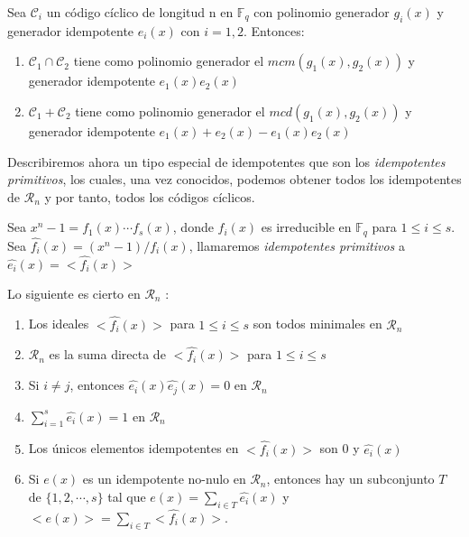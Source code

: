\begin{theorem}
\label{th:inter_suma_generadores}
Sea $\mathcal{C}_i$ un código cíclico de longitud n en $\mathbb{F}_q$ con polinomio generador $g_i(x)$ y generador idempotente $e_i(x)$ con $i = 1,2$. Entonces:
\begin{enumerate}
	\item $\mathcal{C}_1 \cap \mathcal{C}_2$ tiene como polinomio generador el $mcm(g_1(x),g_2(x))$ y generador idempotente $e_1(x)e_2(x)$
	\item $\mathcal{C}_1 + \mathcal{C}_2$ tiene como polinomio generador el $mcd(g_1(x),g_2(x))$ y generador idempotente $e_1(x) + e_2(x) - e_1(x)e_2(x)$
\end{enumerate}
\end{theorem}


Describiremos ahora un tipo especial de idempotentes que son los \textit{idempotentes primitivos}, los cuales, una vez conocidos, podemos obtener todos los idempotentes de $\mathcal{R}_n$ y por tanto, todos los códigos cíclicos.

\begin{definition}
Sea $x^n-1 = f_1(x) \cdots f_s(x)$, donde $f_i(x)$ es irreducible en $\mathbb{F}_q$ para $ 1 \leq i \leq s$. Sea $\widehat{f_i}(x) = (x^n-1)/f_i(x)$, llamaremos \textit{idempotentes primitivos} a $\widehat{e_i}(x)=<\widehat{f_i}(x)>$
\end{definition}

\begin{theorem}
\label{th:idempotentes primitivos}
Lo siguiente es cierto en $\mathcal{R}_n$ :
\begin{enumerate}
	\item Los ideales $<\widehat{f_i}(x)>$ para $ 1 \leq i \leq s$ son todos minimales en $\mathcal{R}_n$
	\item $\mathcal{R}_n$ es la suma directa de $<\widehat{f_i}(x)>$ para $ 1 \leq i \leq s$
	\item Si $ i \neq j $, entonces $\widehat{e_i}(x)\widehat{e_j}(x) = 0$ en $\mathcal{R}_n$
	\item $\sum_{i=1}^s \widehat{e_i}(x) = 1$ en $\mathcal{R}_n$
	\item Los únicos elementos idempotentes en $<\widehat{f_i}(x)>$ son 0 y $\widehat{e_i}(x)$
	\item Si $e(x)$ es un idempotente no-nulo en $\mathcal{R}_n$, entonces hay un subconjunto $T$ de $\{ 1,2, \cdots , s \}$ tal que $e(x) = \sum_{i \in T} \widehat{e_i}(x) $ y $ < e(x) > = \sum_{i \in T} < \widehat{f_i}(x) > $.
\end{enumerate}
\end{theorem}

